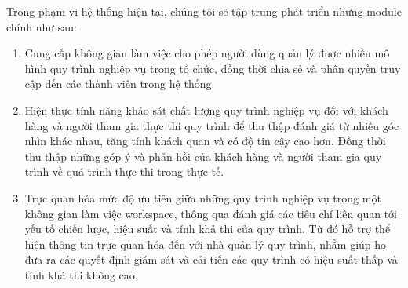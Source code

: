 Trong phạm vi hệ thống hiện tại, chúng tôi sẽ tập trung phát triển những module
chính như sau:

\begin{enumerate}
      \item Cung cấp không gian làm việc cho phép người dùng quản lý được nhiều mô
      hình quy trình nghiệp vụ trong tổ chức, đồng thời chia sẻ và phân quyền
      truy cập đến các thành viên trong hệ thống.

      \item Hiện thực tính năng khảo sát chất lượng quy trình nghiệp vụ đối với khách
            hàng và người tham gia thực thi quy trình để thu thập đánh giá từ nhiều góc
            nhìn khác nhau, tăng tính khách quan và có độ tin cậy cao hơn. Đồng thời thu
            thập những góp ý và phản hồi của khách hàng và người tham gia quy trình về
            quá trình thực thi trong thực tế.

      \item Trực quan hóa mức độ ưu tiên giữa những quy trình nghiệp vụ trong một không
            gian làm việc workspace, thông qua đánh giá các tiêu chí liên quan tới yếu
            tố chiến lược, hiệu suất và tính khả thi của quy trình. Từ đó hỗ trợ thể
            hiện thông tin trực quan hóa đến với nhà quản lý quy trình, nhằm giúp họ đưa
            ra các quyết định giám sát và cải tiến các quy trình có hiệu suất thấp và tính
            khả thi không cao.
\end{enumerate}